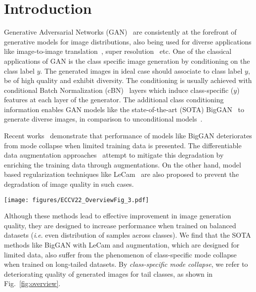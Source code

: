 \documentclass[runningheads,table]{llncs}
\newcommand{\ie}{\textit{i}.\textit{e}. }
\begin{document}
\section{Introduction}
\label{sec:intro}
Generative Adversarial Networks (GAN)~\cite{goodfellow2014generative} are consistently at the forefront of generative models for image distributions, also being used for diverse applications like image-to-image translation~\cite{mao2019mode}, super resolution~\cite{ledig2017photo} etc. One of the classical applications of GAN is the class specific image generation by conditioning on the class label $y$. The generated images in ideal case should associate to class label $y$, be of high quality and exhibit diversity. The conditioning is usually achieved with conditional Batch Normalization (cBN)~\cite{de2017modulating} layers which induce class-specific ($y$) features at each layer of the generator. The additional class conditioning information enables GAN models like the state-of-the-art (SOTA) BigGAN~\cite{brock2018large} to generate diverse images, in comparison to unconditional models~\cite{kang2020contrastive}.

Recent works~\cite{zhao2020differentiable} demonstrate
that performance of models like BigGAN deteriorates from mode collapse when limited training data is presented. The differentiable data augmentation \mbox{approaches}~\cite{zhao2020differentiable, karras2020training, tran2021data} attempt to mitigate this degradation by enriching the training data through augmentations. On the other hand, model based regularization techniques like LeCam~\cite{tseng2021regularizing} are also proposed to prevent the degradation of image quality in such cases.

\begin{figure*}[t]
    \centering
    
    \texttt{[image: figures/ECCV22\_OverviewFig\_3.pdf]}
    \caption{\textbf{Regularizing GANs on long-tailed training data.} \emph{(left)} Images generated from BigGAN trained on long-tailed CIFAR-10. \emph{(right)} FID scores vs. training steps. The proposed gSR regularizer prevents mode collapse, for the tail classes~\cite{brock2018large, tseng2021regularizing, zhao2020differentiable}. }\label{fig:overview}
\end{figure*}Although these methods lead to effective improvement in image generation quality, they are designed to increase performance when trained on balanced datasets (\ie even distribution of samples across classes). We find that the SOTA methods like BigGAN  with LeCam and augmentation, which are designed for limited data, also suffer from the phenomenon of class-specific mode collapse when trained on long-tailed datasets. By \textit{class-specific mode collapse}, we refer to deteriorating quality of generated images for tail classes, as shown in Fig.~\ref{fig:overview}.
\end{document}
